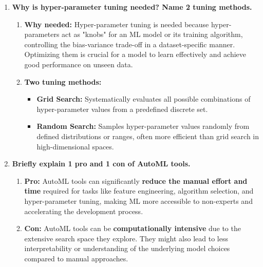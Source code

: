 \documentclass{article}
\begin{document}
\begin{enumerate}
    \item \textbf{Why is hyper-parameter tuning needed? Name 2 tuning methods.}
    \begin{enumerate}[label=\alph*)]
        \item \textbf{Why needed:} Hyper-parameter tuning is needed because hyper-parameters act as "knobs" for an ML model or its training algorithm, controlling the bias-variance trade-off in a dataset-specific manner. Optimizing them is crucial for a model to learn effectively and achieve good performance on unseen data.
        \item \textbf{Two tuning methods:}
        \begin{itemize}
            \item \textbf{Grid Search:} Systematically evaluates all possible combinations of hyper-parameter values from a predefined discrete set.
            \item \textbf{Random Search:} Samples hyper-parameter values randomly from defined distributions or ranges, often more efficient than grid search in high-dimensional spaces.
        \end{itemize}
    \end{enumerate}

    \item \textbf{Briefly explain 1 pro and 1 con of AutoML tools.}
    \begin{enumerate}[label=\alph*)]
        \item \textbf{Pro:} AutoML tools can significantly \textbf{reduce the manual effort and time} required for tasks like feature engineering, algorithm selection, and hyper-parameter tuning, making ML more accessible to non-experts and accelerating the development process.
        \item \textbf{Con:} AutoML tools can be \textbf{computationally intensive} due to the extensive search space they explore. They might also lead to less interpretability or understanding of the underlying model choices compared to manual approaches.
    \end{enumerate}


\end{enumerate}
\end{document}
